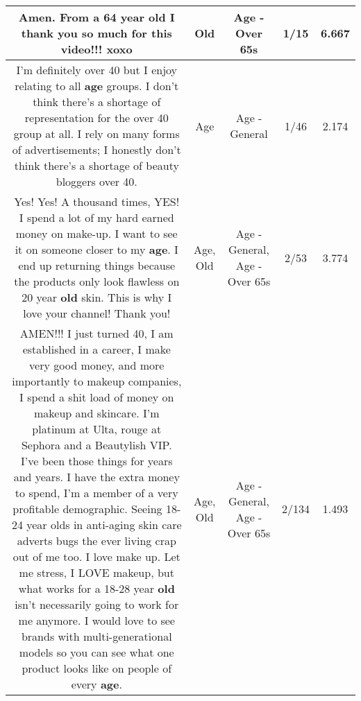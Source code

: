 \documentclass[11pt]{article}
\newlength\mylength
\begin{document}
\begin{center}
\begin{longtable}{|C{.65\mylength}|C{.30\mylength}|C{.12\mylength}|C{.12\mylength}|C{.12\mylength}|}
  \small Amen.  From a 64 year \textbf{old} I thank you so much for this video!!!  xoxo\normalsize   & Old & Age - Over 65s & 1/15 & 6.667 \\  \hline
  \small I'm definitely over 40 but I enjoy relating to all \textbf{age} groups. I don't think there's a shortage of representation for the over 40 group at all. I rely on many forms of advertisements; I honestly don't think there's a shortage of beauty bloggers over 40.\normalsize   & Age & Age - General & 1/46 & 2.174 \\  \hline
  \small Yes! Yes! A thousand times, YES! I spend a lot of my hard earned money on make-up. I want to see it on someone closer to my \textbf{age}. I end up returning things because the products only look flawless on 20 year \textbf{old} skin. This is why I love your channel! Thank you!\normalsize   & Age, Old & Age - General, Age - Over 65s & 2/53 & 3.774 \\  \hline
  \small AMEN!!! I just turned 40, I am established in a career, I make very good money, and more importantly to makeup companies, I spend a shit load of money on makeup and skincare. I'm platinum at Ulta, rouge at Sephora and a Beautylish VIP. I've been those things for years and years. I have the extra money to spend, I'm a member of a very profitable demographic. Seeing 18-24 year olds in anti-aging skin care adverts bugs the ever living crap out of me too. I love make up. Let me stress, I LOVE makeup, but what works for a 18-28 year \textbf{old} isn't necessarily going to work for me anymore. I would love to see brands with multi-generational models so you can see what one product looks like on people of every \textbf{age}.\normalsize   & Age, Old & Age - General, Age - Over 65s & 2/134 & 1.493 \\  \hline

\end{longtable}
\end{center}
\end{document}
